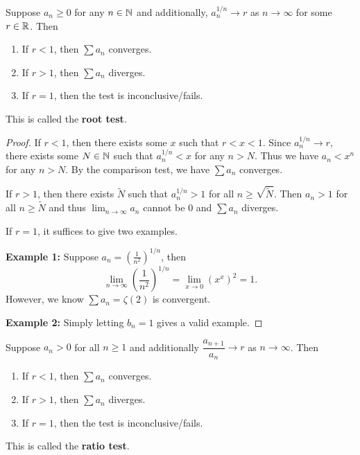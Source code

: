 \documentclass[a4paper]{ctexart}
\begin{document}
    \begin{mythm}
        Suppose $a_n \ge 0$ for any $n\in \mathbb{N}$ and additionally, $a_n^{1/n} \to r$ as $n\to \infty$ for some $r\in \mathbb{R}$. Then
        \begin{enumerate}[label=(\arabic*)]
            \item If $r<1$, then $\displaystyle \sum a_n$ converges.
            \item If $r>1$, then $\displaystyle \sum a_n$ diverges.
            \item If $r=1$, then the test is inconclusive/fails.
        \end{enumerate}
        This is called the \textbf{root test}.
    \end{mythm}
    \begin{proof}
        If $r<1$, then there exists some $x$ such that $r<x<1$. Since $a_n^{1/n} \to r$, there exists some $N\in \mathbb{N}$ such that $a_n^{1/n} < x$ for any $n > N$. Thus we have $a_n < x^n$ for any $n > N$. By the comparison test, we have $\displaystyle \sum a_n$ converges.

        If $r>1$, then there exists $\tilde{N}$ such that $a_n^{1/n} >1$ for all $n\ge \sqrt{\tilde{N}}$. Then $a_n>1$ for all $n\ge \tilde{N}$ and thus $\displaystyle \lim_{n\to \infty} a_n$ cannot be $0$ and $\displaystyle \sum a_n$ diverges.

        If $r=1$, it suffices to give two examples.

        \textbf{Example 1:} Suppose $\displaystyle a_n = \left( \frac{1}{n^2} \right) ^{1/n}$, then
        \[
        \lim_{n\to \infty} \left( \frac{1}{n^2} \right) ^{1/n} = \lim_{x\to 0} \left( x^x \right)^2 = 1.
        \]
        However, we know $\displaystyle \sum a_n = \zeta(2)$ is convergent.

        \textbf{Example 2:} Simply letting $b_n=1$ gives a valid example.
        
    \end{proof}
    \begin{mythm}
        Suppose $a_n>0$ for all $n\ge 1$ and additionally $\dfrac{a_{n+1}}{a_n} \to r$ as $n\to \infty$. Then
        \begin{enumerate}[label=(\arabic*)]
            \item If $r<1$, then $\displaystyle \sum a_n$ converges.
            \item If $r>1$, then $\displaystyle \sum a_n$ diverges.
            \item If $r=1$, then the test is inconclusive/fails.
        \end{enumerate}
        This is called the \textbf{ratio test}.
    \end{mythm}
\end{document}
